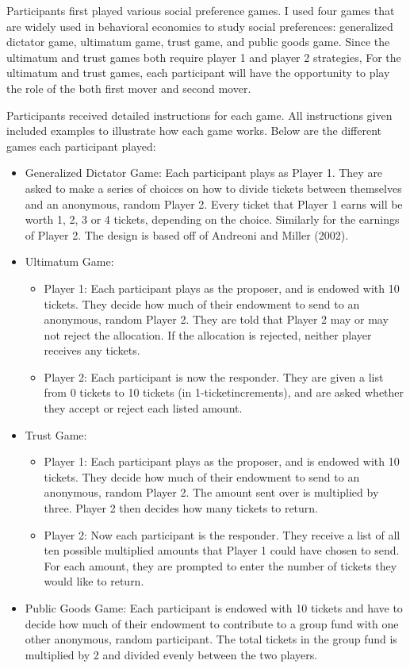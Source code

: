 \documentclass{article}
\begin{document}
Participants first played various social preference games. I used four games that are widely used in behavioral economics to study social preferences: generalized dictator game, ultimatum game, trust game, and public goods game. {\color{red}Since the ultimatum and trust games both require player 1 and player 2 strategies, For the ultimatum and trust games, each participant will have the opportunity to play the role of the both first mover and second mover. }


Participants received detailed instructions for each game. All instructions given included examples to illustrate how each game works. Below are the different games each participant played: 

\begin{itemize}

\item{Generalized Dictator Game}:  Each participant plays as Player 1. They are asked to make a series of choices on how to divide tickets between themselves and an anonymous, random Player 2. Every ticket that Player 1 earns will be worth 1, 2, 3 or 4 tickets, depending on the choice. Similarly for the earnings of Player 2. The design is based off of Andreoni and Miller (2002).
\item{Ultimatum Game}: 
	\begin{itemize}
		\item{Player 1}: Each participant plays as the proposer, and is endowed with 10 tickets. They decide how much of their endowment to send to an anonymous, random Player 2. They are told that Player 2 may or may not reject the allocation. If the allocation is rejected, neither player receives any tickets.
		\item{Player 2}: Each participant is now the responder. They are given a list from 0 tickets to 10 tickets (in 1-ticketincrements), and are asked whether they accept or reject each listed amount.
	\end{itemize}
\item{Trust Game}:
	\begin{itemize}
		\item{Player 1}: Each participant plays as the proposer, and is endowed with 10 tickets. They decide how much of their endowment to send to an anonymous, random Player 2. The amount sent over is multiplied by three. Player 2 then decides how many tickets to return. 
		\item{Player 2}: Now each participant is the responder. They receive a list of all ten possible multiplied amounts that Player 1 could have chosen to send. For each amount, they are prompted to enter the number of tickets they would like to return.
	\end{itemize}
\item{Public Goods Game}: Each participant is endowed with 10 tickets and have to decide how much of their endowment to contribute to a group fund with one other anonymous, random participant. The total tickets in the group fund is multiplied by 2 and divided evenly between the two players.

\end{itemize}
\end{document}
